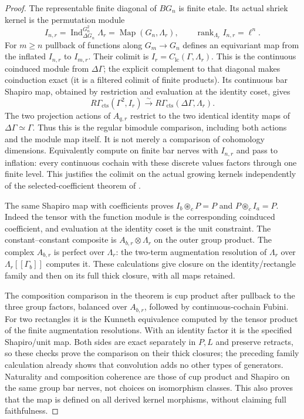 \documentclass[11pt]{article}
\theoremstyle{definition}
\theoremstyle{remark}
\begin{document}
\begin{proof}
The representable finite diagonal of $BG_n$ is finite etale.
Its actual shriek kernel is the permutation module
\[
 I_{n,r}=\operatorname{Ind}_{\Delta G_n}^{G_n^2}\Lambda_r
          =\operatorname{Map}(G_n,\Lambda_r),
 \qquad \operatorname{rank}_{\Lambda_r} I_{n,r}=\ell^n.
\]
For $m\geq n$ pullback of functions along $G_m\to G_n$ defines
an equivariant map from the inflated $I_{n,r}$ to $I_{m,r}$.
Their colimit is $I_r=C_{\mathrm{lc}}(\Gamma,\Lambda_r)$.
This is the continuous coinduced module from $\Delta\Gamma$;
the explicit complement to that diagonal makes coinduction exact
(it is a filtered colimit of finite products).  Its continuous bar
Shapiro map, obtained by restriction and evaluation at the identity
coset, gives
\[
 R\Gamma_{\mathrm{cts}}(\Gamma^2,I_r)
       \xrightarrow{\sim}R\Gamma_{\mathrm{cts}}(\Delta\Gamma,\Lambda_r).
\]
The two projection actions of $A_{q,r}$ restrict to the two identical
identity maps of $\Delta\Gamma\simeq\Gamma$.  Thus this is the
regular bimodule comparison, including both actions and the module
map itself.  It is not merely a comparison of cohomology dimensions.
Equivalently compute on finite bar nerves with $I_{n,r}$ and pass
to inflation: every continuous cochain with these discrete values
factors through one finite level.  This justifies the colimit on
the actual growing kernels independently of the selected-coefficient
theorem of \cite{Local}.

The same Shapiro map with coefficients proves
$I_b\circledast_c P=P$ and $P\circledast_c I_a=P$.
Indeed the tensor with the function module is the corresponding
coinduced coefficient, and evaluation at the identity coset is the
unit constraint.  The constant--constant composite is
$A_{b,r}\otimes\Lambda_r$ on the outer group product.  The complex
$A_{b,r}$ is perfect over $\Lambda_r$: the two-term augmentation
resolution of $\Lambda_r$ over $\Lambda_r[[\Gamma_b]]$ computes it.
These calculations give closure on the identity/rectangle family
and then on its full thick closure, with all maps retained.

The composition comparison in the theorem is cup product after
pullback to the three group factors, balanced over $A_{b,r}$,
followed by continuous-cochain Fubini.  For two rectangles it is
the Kunneth equivalence computed by the tensor product of the
finite augmentation resolutions.  With an identity factor it is
the specified Shapiro/unit map.  Both sides are exact separately
in $P,L$ and preserve retracts, so these checks prove the comparison
on their thick closures; the preceding family calculation already
shows that convolution adds no other types of generators.
Naturality and composition coherence are those of cup product and
Shapiro on the same group bar nerves, not choices on isomorphism
classes.  This also proves that the map is defined on all derived
kernel morphisms, without claiming full faithfulness.


\end{proof}
\end{document}
